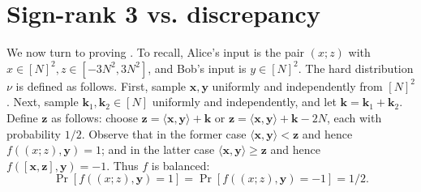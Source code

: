\documentclass{toc}
\newcommand{\x}{\mathbf{x}}
\newcommand{\y}{\mathbf{y}}
\newcommand{\z}{\mathbf{z}}
\newcommand{\Bk}{\mathbf{k}}   %
\newcommand{\ip}[1]{\langle #1 \rangle}
\newcommand{\pair}[2]{( #1; #2 )}
\begin{document}
%
%
%
%
%
%


\section{Sign-rank 3 vs. discrepancy}\label{sec:signrank3}

We now turn to %
proving  %
. To recall, Alice's input is the pair $\pair{x}{z}$ with $x \in [N]^2, z \in [-3N^2, 3N^2]$, and Bob's input is $y \in [N]^2$.
The hard distribution $\nu$ is defined as follows. First, sample $\x,\y$ uniformly and independently from $[N]^2$. Next, sample $\Bk_1,\Bk_2 \in [N]$ uniformly and independently, and let $\Bk = \Bk_1 + \Bk_2$. Define $\z$ as follows: choose $\z=\ip{\x,\y} +\Bk$ or $\z=\ip{\x,\y} +\Bk-2N$, each with probability $1/2$. Observe that in the former case $\ip{\x,\y} < \z$ and hence $f(\pair{x}{z},\y)=1$;
and in the latter case $\ip{\x,\y} \ge \z$ and hence $f([\x,\z],\y)=-1$. Thus $f$ is balanced:
$$
\Pr[f(\pair{x}{z},\y)=1] = \Pr[f(\pair{x}{z},\y)=-1] = 1/2.
$$

%
\end{document}
